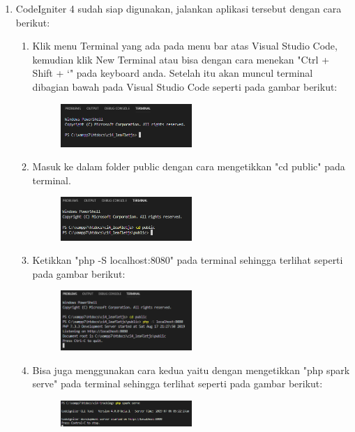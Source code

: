 \begin{enumerate}
		\item CodeIgniter 4 sudah siap digunakan, jalankan aplikasi tersebut dengan cara berikut:
		\label{cararunci4}
		\begin{enumerate}
		    \item Klik menu Terminal yang ada pada menu bar atas Visual Studio Code, kemudian klik New Terminal atau bisa dengan cara menekan "Ctrl + Shift + `" pada keyboard anda. Setelah itu akan muncul terminal dibagian bawah pada Visual Studio Code seperti pada gambar berikut:
    		\begin{figure}[!htbp]
        		\centering
        		\includegraphics[width=0.5\textwidth]{figures/CODEIGNITER4/CI6.PNG}
        		\label{CodeIgniter6}
    		\end{figure}
    		
    		\item Masuk ke dalam folder public dengan cara mengetikkan "cd public" pada terminal.
    		\begin{figure}[!htbp]
        		\centering
        		\includegraphics[width=0.5\textwidth]{figures/CODEIGNITER4/CI7.PNG}
        		\label{CodeIgniter7}
    		\end{figure}
    		
    		\item Ketikkan "php -S localhost:8080" pada terminal sehingga terlihat seperti pada gambar berikut:
    		\begin{figure}[!htbp]
        		\centering
        		\includegraphics[width=0.5\textwidth]{figures/CODEIGNITER4/CI8.PNG}
        		\label{CodeIgniter8}
    		\end{figure}
    		
    		\item Bisa juga menggunakan cara kedua yaitu dengan mengetikkan "php spark serve" pada terminal sehingga terlihat seperti pada gambar berikut:
    		\begin{figure}[!htbp]
        		\centering
        		\includegraphics[width=0.5\textwidth]{figures/CODEIGNITER4/CI8_1.PNG}
        		\label{CodeIgniter9}
    		\end{figure}
    		

\end{enumerate}
\end{enumerate}
